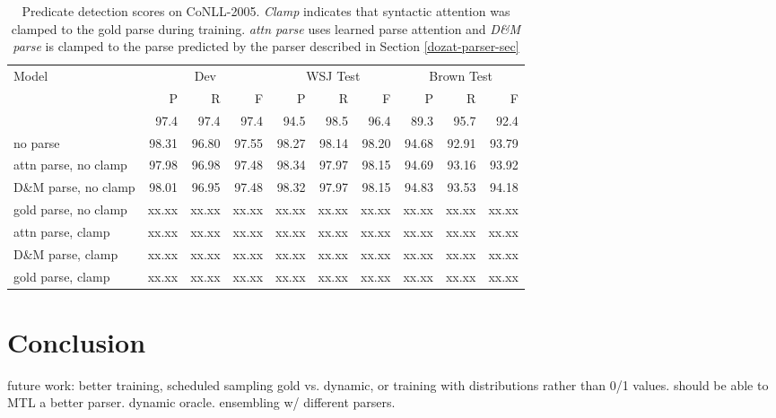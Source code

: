 \documentclass[11pt,a4paper]{article}
\begin{document}
\begin{table*}
\begin{tabular}{lrrrrrrrrr}
\multirow{2}{*}{Model} & \multicolumn{3}{c}{Dev} & \multicolumn{3}{c}{WSJ Test} & \multicolumn{3}{c}{Brown Test} \\ 
& P & R & F & P & R & F & P & R & F \\ \hline \hline
\citet{he2017deep} & 97.4 & 97.4 & 97.4 & 94.5 & 98.5 & 96.4 & 89.3 & 95.7 & 92.4 \\ \hline
no parse &   98.31 &  96.80 &  97.55 &  98.27 &  98.14 &  98.20 &  94.68  & 92.91 &  93.79\\
attn parse, no clamp &  97.98  & 96.98 &  97.48 & 98.34 &  97.97 &  98.15 & 94.69 & 93.16 & 93.92\\
D\&M parse, no clamp & 98.01 &  96.95  & 97.48 & 98.32  & 97.97  & 98.15 & 94.83 &  93.53 &  94.18 \\
gold parse, no clamp & xx.xx  & xx.xx  & xx.xx  & xx.xx  & xx.xx  & xx.xx  & xx.xx  & xx.xx  & xx.xx \\
attn parse, clamp & xx.xx  & xx.xx  & xx.xx  & xx.xx  & xx.xx  & xx.xx  & xx.xx  & xx.xx  & xx.xx \\
D\&M parse, clamp & xx.xx  & xx.xx  & xx.xx  & xx.xx  & xx.xx  & xx.xx  & xx.xx  & xx.xx  & xx.xx \\
gold parse, clamp & xx.xx  & xx.xx  & xx.xx  & xx.xx  & xx.xx  & xx.xx  & xx.xx  & xx.xx  & xx.xx \\


\end{tabular}
\caption{Predicate detection scores on CoNLL-2005.  \emph{Clamp} indicates that syntactic attention was clamped to the gold parse during training. \emph{attn parse} uses learned parse attention and \emph{D\&M parse} is clamped to the parse predicted by the parser described in Section \ref{dozat-parser-sec}}
\end{table*}

\section{Conclusion}

future work: better training, scheduled sampling gold vs. dynamic, or training with distributions rather than 0/1 values. should be able to MTL a better parser. dynamic oracle. ensembling w/ different parsers.
\end{document}
